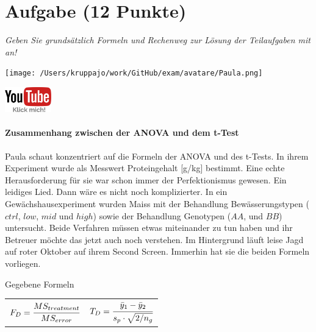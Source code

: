 \documentclass[a4paper, 9pt]{scrartcl}\usepackage[]{graphicx}\usepackage[]{xcolor}
\begin{document}
\clearpage

\section{Aufgabe \hfill (12 Punkte)}

\textit{Geben Sie grundsätzlich Formeln und Rechenweg zur Lösung der Teilaufgaben mit an!} \\[1Ex]
 

 
\begin{minipage}[t]{0.5\textwidth}
\texttt{[image: /Users/kruppajo/work/GitHub/exam/avatare/Paula.png]}
\end{minipage}
\begin{minipage}[t]{0.5\textwidth}
\hfill
\href{https://youtu.be/FjjJXkFJfIY}{\includegraphics[width = 2cm]{img/youtube}}
\end{minipage}
\vspace{-3Ex}



\paragraph{Zusammenhang zwischen der ANOVA und dem t-Test}

Paula schaut konzentriert auf die Formeln der ANOVA und des t-Tests. In ihrem Experiment wurde als Messwert Proteingehalt [g/kg] bestimmt. Eine echte Herausforderung für sie war schon immer der Perfektionismus gewesen. Ein leidiges Lied. Dann wäre es nicht noch komplizierter. In ein Gewächshausexperiment wurden Maiss mit der Behandlung Bewässerungstypen ($ctrl$, $low$, $mid$ und $high$) sowie der Behandlung Genotypen ($AA$, und $BB$) untersucht. Beide Verfahren müssen etwas miteinander zu tun haben und ihr Betreuer möchte das jetzt auch noch verstehen. Im Hintergrund läuft leise Jagd auf roter Oktober auf ihrem Second Screen. Immerhin hat sie die beiden Formeln vorliegen.

\begin{graybox}{Gegebene Formeln}
\begin{center}
  \begin{tabular}{cc}
    $F_{D} = \cfrac{MS_{treatment}}{MS_{error}}$ & $T_{D} = \cfrac{\bar{y}_1 - \bar{y}_2}{s_p \cdot \sqrt{2/n_g}}$\\
  \end{tabular}
\end{center}
\end{graybox}
\end{document}
